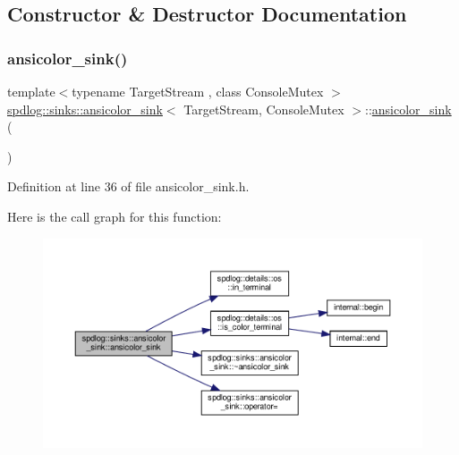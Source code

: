 \subsection{Constructor \& Destructor Documentation}
\mbox{\label{classspdlog_1_1sinks_1_1ansicolor__sink_aed8c41cc6f792b27bc37d2f46536268d}} 
\subsubsection{\texorpdfstring{ansicolor\+\_\+sink()}{ansicolor\_sink()}\hspace{0.1cm}{\footnotesize\ttfamily [1/2]}}
{\footnotesize\ttfamily template$<$typename Target\+Stream , class Console\+Mutex $>$ \\
\hyperlink{classspdlog_1_1sinks_1_1ansicolor__sink}{spdlog\+::sinks\+::ansicolor\+\_\+sink}$<$ Target\+Stream, Console\+Mutex $>$\+::\hyperlink{classspdlog_1_1sinks_1_1ansicolor__sink}{ansicolor\+\_\+sink} (\begin{DoxyParamCaption}{ }\end{DoxyParamCaption})\hspace{0.3cm}{\ttfamily [inline]}}



Definition at line 36 of file ansicolor\+\_\+sink.\+h.

Here is the call graph for this function\+:
\nopagebreak
\begin{figure}[H]
\begin{center}
\leavevmode
\includegraphics[width=350pt]{classspdlog_1_1sinks_1_1ansicolor__sink_aed8c41cc6f792b27bc37d2f46536268d_cgraph}
\end{center}
\end{figure}
\mbox{\label{classspdlog_1_1sinks_1_1ansicolor__sink_abca2e1439a310ff1a4d75044a5c718d1}} 
